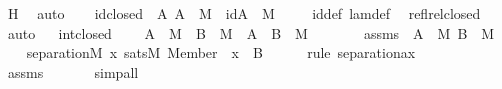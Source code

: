 \begin{isabellebody}
\ H\ \isamarkupfalse%
\ auto\ \isanewline
{}\isamarkupfalse%
%
\endisatagproof
{\isafoldproof}%
%
\isadelimproof
\ \isanewline
%
\endisadelimproof
\isanewline
{}\isamarkupfalse%
\ id{\isacharunderscore}{\kern0pt}closed\ {\isacharcolon}{\kern0pt}\ {\isachardoublequoteopen}{\isasymAnd}A{\isachardot}{\kern0pt}\ A\ {\isasymin}\ M\ {\isasymLongrightarrow}\ id{\isacharparenleft}{\kern0pt}A{\isacharparenright}{\kern0pt}\ {\isasymin}\ M{\isachardoublequoteclose}\ \isanewline
%
\isadelimproof
\ \ %
\endisadelimproof
%
\isatagproof
{}\isamarkupfalse%
\ id{\isacharunderscore}{\kern0pt}def\ lam{\isacharunderscore}{\kern0pt}def\ \isamarkupfalse%
\ refl{\isacharunderscore}{\kern0pt}rel{\isacharunderscore}{\kern0pt}closed\ \isamarkupfalse%
\ auto%
\endisatagproof
{\isafoldproof}%
%
\isadelimproof
\ \isanewline
%
\endisadelimproof
\isanewline
{}\isamarkupfalse%
\ int{\isacharunderscore}{\kern0pt}closed\ {\isacharcolon}{\kern0pt}\ \isanewline
\ \ {\isachardoublequoteopen}A\ {\isasymin}\ M\ {\isasymLongrightarrow}\ B\ {\isasymin}\ M\ {\isasymLongrightarrow}\ A\ {\isasyminter}\ B\ {\isasymin}\ M{\isachardoublequoteclose}\ \isanewline
%
\isadelimproof
%
\endisadelimproof
%
\isatagproof
{}\isamarkupfalse%
\ {\isacharminus}{\kern0pt}\ \isanewline
\ \ \isamarkupfalse%
\ assms\ {\isacharcolon}{\kern0pt}\ {\isachardoublequoteopen}A\ {\isasymin}\ M{\isachardoublequoteclose}\ {\isachardoublequoteopen}B\ {\isasymin}\ M{\isachardoublequoteclose}\ \isanewline
\ \ \isamarkupfalse%
\ {\isachardoublequoteopen}separation{\isacharparenleft}{\kern0pt}{\isacharhash}{\kern0pt}{\isacharhash}{\kern0pt}M{\isacharcomma}{\kern0pt}\ {\isasymlambda}x{\isachardot}{\kern0pt}\ sats{\isacharparenleft}{\kern0pt}M{\isacharcomma}{\kern0pt}\ Member{\isacharparenleft}{\kern0pt}{}{\isacharcomma}{\kern0pt}\ {}{\isacharparenright}{\kern0pt}{\isacharcomma}{\kern0pt}\ {\isacharbrackleft}{\kern0pt}x{\isacharbrackright}{\kern0pt}\ {\isacharat}{\kern0pt}\ {\isacharbrackleft}{\kern0pt}B{\isacharbrackright}{\kern0pt}{\isacharparenright}{\kern0pt}{\isacharparenright}{\kern0pt}{\isachardoublequoteclose}\ \isanewline
\ \ \ \ \isamarkupfalse%
{\isacharparenleft}{\kern0pt}rule\ separation{\isacharunderscore}{\kern0pt}ax{\isacharparenright}{\kern0pt}\ \isanewline
\ \ \ \ \isamarkupfalse%
\ assms\ \isanewline
\ \ \ \ \isamarkupfalse%
\ simp{\isacharunderscore}{\kern0pt}all\isanewline

\end{isabellebody}
